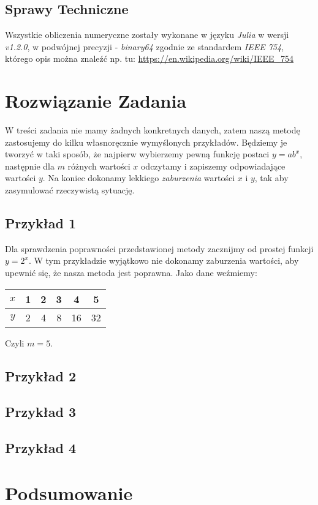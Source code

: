 \documentclass[12pt,a4paper]{article}
\begin{document}
\subsection{Sprawy Techniczne}
Wszystkie obliczenia numeryczne zostały wykonane w języku \textit{Julia} w wersji \textit{v1.2.0}, w podwójnej precyzji - \textit{binary64} zgodnie ze standardem \textit{IEEE 754}, którego opis można znaleźć np. tu: \url{https://en.wikipedia.org/wiki/IEEE_754}

\section{Rozwiązanie Zadania}
W treści zadania nie mamy żadnych konkretnych danych, zatem naszą metodę zastosujemy do kilku własnoręcznie wymyślonych przykładów. Będziemy je tworzyć w taki sposób, że najpierw wybierzemy pewną funkcję postaci $y=ab^x$, następnie dla $m$ różnych wartości $x$ odczytamy i zapiszemy odpowiadające wartości $y$. Na koniec dokonamy lekkiego \textit{zaburzenia} wartości $x$ i $y$, tak aby zasymulować rzeczywistą sytuację.

\subsection{Przykład 1}
Dla sprawdzenia poprawności przedstawionej metody zacznijmy od prostej funkcji $y=2^x$. W tym przykładzie wyjątkowo nie dokonamy zaburzenia wartości, aby upewnić się, że nasza metoda jest poprawna. Jako dane weźmiemy:
\begin{center}
	\begin{tabular}{|c|c|c|c|c|c|} \hline
	$x$ & 1 & 2 & 3 & 4 & 5   \\ \hline
	$y$ & 2 & 4 & 8 & 16& 32  \\ \hline
	\end{tabular}
\end{center}
Czyli $m=5$.
\subsection{Przykład 2}

\subsection{Przykład 3}

\subsection{Przykład 4}

\section{Podsumowanie}
\end{document}
